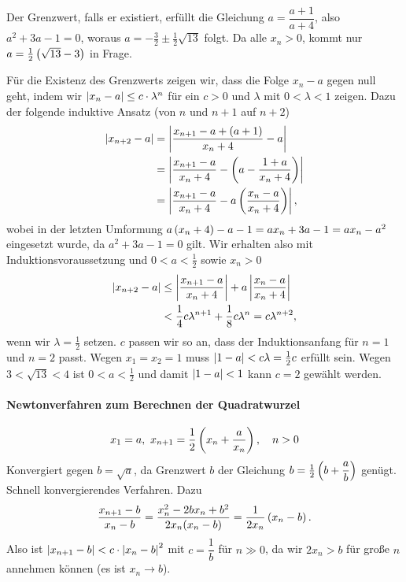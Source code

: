 \documentclass[11pt,a4paper]{article}
\begin{document}
\begin{loesung}
Der Grenzwert, falls er existiert, erfüllt die Gleichung $a=\dfrac{a+1}{a+4}$,
also $a^2+3a-1=0$, woraus $a=-\frac32\pm\frac12\sqrt{13}$ folgt.  Da alle
$x_n>0$, kommt nur $a=\frac12\left(\sqrt{13}-3\right)$ in Frage.

Für die Existenz des Grenzwerts zeigen wir, dass die Folge $x_n-a$ gegen null
geht, indem wir $\left\vert x_n-a\right\vert\le c\cdot \lambda^n$ für ein $c>0$ und $\lambda$ mit
$0<\lambda<1$ zeigen. Dazu der folgende induktive Ansatz (von $n$ und $n+1$
auf $n+2$)
\begin{align*}
  \left\vert x_{n+2}-a\right\vert&=\left\vert \frac{x_{n+1}-a+(a+1)}{x_n+4}-a\right\vert\\
  &=\left\vert \frac{x_{n+1}-a}{x_n+4}-\left(a-\frac{1+a}{x_n+4}\right)\right\vert\\
  &=\left\vert \frac{x_{n+1}-a}{x_n+4}-a\left(\frac{x_n-a}{x_n+4}\right)\right\vert,
\end{align*}
wobei in der letzten Umformung $a\left(x_n+4\right)-a-1=ax_n+3a-1=ax_n-a^2$ eingesetzt
wurde, da $a^2+3a-1=0$ gilt.  Wir erhalten also mit Induktionsvoraussetzung
und $0<a<\frac12$ sowie $x_n>0$
\begin{align*}
  \left\vert x_{n+2}-a\right\vert&\le
  \left\vert \frac{x_{n+1}-a}{x_n+4}\right\vert+a\left\vert \frac{x_n-a}{x_n+4}\right\vert\\
  &<\frac14 c \lambda^{n+1} + \frac18 c \lambda^n = c \lambda^{n+2},
\end{align*}
wenn wir $\lambda=\frac12$ setzen. $c$ passen wir so an, dass der
Induktionsanfang für $n=1$ und $n=2$ passt.  Wegen $x_1=x_2=1$ muss
$\left\vert 1-a\right\vert<c \lambda=\frac12 c$ erfüllt sein. Wegen $3<\sqrt{13}<4$ ist
$0<a<\frac12$ und damit $\left\vert 1-a\right\vert<1$ kann $c=2$ gewählt werden.   
\end{loesung}

\paragraph{Newtonverfahren zum Berechnen der Quadratwurzel}
\begin{gather*}
  x_1=a,\ x_{n+1}=\frac12\left(x_n+\frac{a}{x_n}\right),\quad n>0
\end{gather*}
Konvergiert gegen $b=\sqrt{a}$, da Grenzwert $b$ der Gleichung
$b=\frac12\left(b+\dfrac{a}{b}\right)$ genügt. Schnell konvergierendes Verfahren.
Dazu
\begin{gather*}
  \frac{x_{n+1}-b}{x_n-b}=\frac{x_n^2-2bx_n+b^2}{2x_n(x_n-b)}
  =\frac{1}{2x_n}\left(x_n-b\right).
\end{gather*}
Also ist $\left\vert x_{n+1}-b\right\vert<c\cdot\left\vert x_n-b\right\vert^2$ mit $c=\dfrac{1}{b}$ für $n\gg 0$,
da wir $2x_n>b$ für große $n$ annehmen können (es ist $x_n\to b$).
\end{document}
